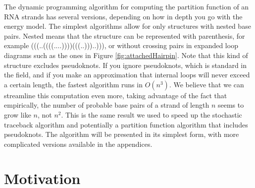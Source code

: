 The dynamic programming algorithm for computing the partition function
of an RNA strands has several versions, depending on how in depth you
go with the energy model. The simplest algorithms allow for only
structures with nested base pairs. Nested means that the structure can
be represented with parenthesis, for example
(((..((((....))))(((..)))..))), or without crossing pairs in expanded
loop diagrams such as the ones in Figure
\ref{fig:attachedHairpin}. Note that this kind of structure excludes
pseudoknots.  If you ignore pseudoknots, which is standard in the
field, and if you make an approximation that internal loops will never
exceed a certain length, the fastest algorithm runs in $O(n^3)$. We
believe that we can streamline this computation even more, taking
advantage of the fact that empirically, the number of probable base
pairs of a strand of length $n$ seems to grow like $n$, not
$n^2$. This is the same result we used to speed up the stochastic
traceback algorithm and potentially a partition function algorithm
that includes pseudoknots. The algorithm will be presented in its
simplest form, with more complicated versions available in the
appendices.

\section{Motivation}

